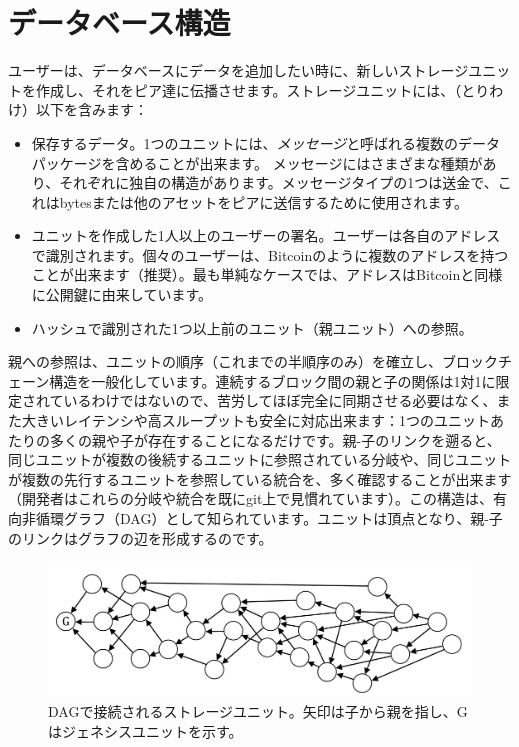 \documentclass[a4paper, dvipdfmx]{jsarticle}
\begin{document}
\section{データベース構造}

ユーザーは、データベースにデータを追加したい時に、新しいストレージユニットを作成し、それをピア達に伝播させます。ストレージユニットには、（とりわけ）以下を含みます：
\begin{itemize}
    \item 保存するデータ。1つのユニットには、{\it メッセージ}と呼ばれる複数のデータパッケージを含めることが出来ます。 メッセージにはさまざまな種類があり、それぞれに独自の構造があります。メッセージタイプの1つは送金で、これはbytesまたは他のアセットをピアに送信するために使用されます。
    \item ユニットを作成した1人以上のユーザーの署名。ユーザーは各自のアドレスで識別されます。個々のユーザーは、Bitcoinのように複数のアドレスを持つことが出来ます（推奨）。最も単純なケースでは、アドレスはBitcoinと同様に公開鍵に由来しています。
    \item ハッシュで識別された1つ以上前のユニット（親ユニット）への参照。
\end{itemize}
親への参照は、ユニットの順序（これまでの半順序のみ）を確立し、ブロックチェーン構造を一般化しています。連続するブロック間の親と子の関係は1対1に限定されているわけではないので、苦労してほぼ完全に同期させる必要はなく、また大きいレイテンシや高スループットも安全に対応出来ます：1つのユニットあたりの多くの親や子が存在することになるだけです。親-子のリンクを遡ると、同じユニットが複数の後続するユニットに参照されている分岐や、同じユニットが複数の先行するユニットを参照している統合を、多く確認することが出来ます（開発者はこれらの分岐や統合を既にgit上で見慣れています）。この構造は、有向非循環グラフ（DAG）として知られています。ユニットは頂点となり、親-子のリンクはグラフの辺を形成するのです。

\begin{figure}[htbp]
  \includegraphics[width=\linewidth]{fig1.png}
  \caption{DAGで接続されるストレージユニット。矢印は子から親を指し、Gはジェネシスユニットを示す。}
\end{figure}
\end{document}

